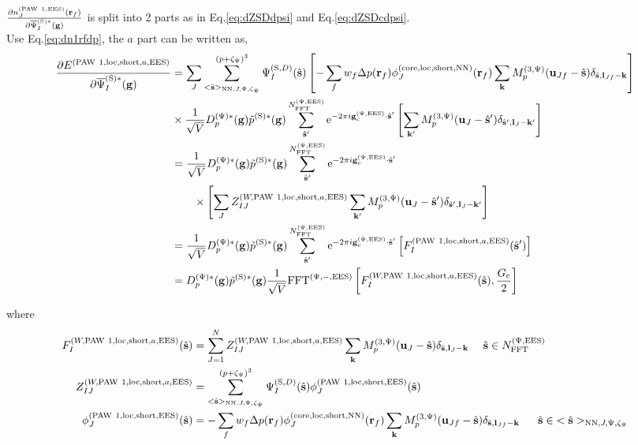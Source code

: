 \documentclass[paper=a4, fontsize=11pt]{article} %
\numberwithin{equation}{section} %
\numberwithin{figure}{section} %
\numberwithin{table}{section} %
\newcommand{\p}{\partial}
\newcommand{\bu}{{\bf{u}}}
\newcommand{\bl}{{\bf{l}}}
\newcommand{\bk}{{\bf{k}}}
\newcommand{\bs}{{\bf{s}}}
\newcommand{\bg}{{\bf{g}}}
\newcommand{\br}{{\bf{r}}}
\newcommand{\hs}{{\hat{\bf{s}}}}
\newcommand{\rS}{{\mathrm{S}}}
\newcommand{\rEES}{{\mathrm{EES}}}
\newcommand{\rcore}{{\mathrm{core}}}
\newcommand{\rNN}{{\mathrm{NN}}}
\newcommand{\re}{{\mathrm{e}}}
\newcommand{\rshort}{{\mathrm{short}}}
\newcommand{\rP}{{\mathrm{PAW}}}
\newcommand{\rlo}{{\mathrm{loc}}}
\newcommand{\gcpEES}{{\bg_c^{(\Psi,\rEES)}}}
\newcommand{\psigsc}{{\overline \Psi_I^{(\rS)*}(\bg)}}
\newcommand{\NFFTpEES}{{N^{\mathrm{(\Psi,\rEES})}_{\mathrm{FFT}}}}
\newcommand{\hGc}{{\frac{G_{\mathrm{c}}}{2}}}
\newcommand{\Dpgc}{{D^{(\Psi)*}_p(\bg)}}
\newcommand{\Mp}{{M_p^{(3,\Psi)}}}
\newcommand{\FFTpiEES}{{\mathrm{FFT}^{(\Psi,-,\rEES)}}}
\newcommand{\pzp}{{(p+\zeta_{\Psi})^3}}
\newcommand{\hsJp}{{<\hs>_{\rNN,J,\Psi,\zeta_\Psi}}}
\newcommand{\hsinJp}{{\ \ \ \ \ \hs  \in  \hsJp}}
\newcommand{\hsinpEES}{{\ \ \ \ \hs \in \NFFTpEES}}
\begin{document}
$\frac{\p n_J^{(\rP\ 1,\rEES)}(\br_f)}{\p \psigsc}$ is split into 2 parts as in Eq.\eqref{eq:dZSDdpsi} and Eq.\eqref{eq:dZSDcdpsi}.\\

Use Eq.\eqref{eq:dn1rfdp}, the $a$ part can be written as,
\begin{equation}
\begin{split}
\frac{\p E^{(\rP\ 1,\rlo,\rshort,a,\rEES)}}{\p \psigsc}
&= \sum_J \sum_{\hsJp}^\pzp \Psi_{I}^{(\rS,D)}(\hat \bs) \left[-\sum_f w_f \Delta p(\br_f) \phi_J^{(\rcore,\rlo,\rshort,\rNN)}(\br_f) \sum_{\bk} \Mp(\bu_{Jf}-\hat \bs)\delta_{\hat \bs,\bl_{Jf}-\bk}\right] \\
&\times \frac{1}{\sqrt{V}} \Dpgc \tilde p^{(\rS)*}(\bg)  \sum_{\hat \bs'}^\NFFTpEES \re^{-2\pi i\gcpEES \cdot \hat\bs'} \left[\sum_{\bk'} \Mp(\bu_{J}-\hat \bs') \delta_{\hat \bs',\bl_J-\bk'}\right] \\
&= \frac{1}{\sqrt{V}} \Dpgc \tilde p^{(\rS)*}(\bg)\sum_{\hat \bs'}^\NFFTpEES \re^{-2\pi i\gcpEES \cdot \hat\bs'} \\
&\ \ \ \ \ \ \times \left[\sum_J Z_{IJ}^{(W,\rP\ 1,\rlo,\rshort,a,\rEES)}\sum_{\bk'} \Mp(\bu_{J}-\hat \bs') \delta_{\hat \bs',\bl_J-\bk'}\right] \\
&= \frac{1}{\sqrt{V}} \Dpgc \tilde p^{(\rS)*}(\bg)\sum_{\hat \bs'}^\NFFTpEES \re^{-2\pi i\gcpEES \cdot \hat\bs'} \left[F_I^{(\rP\ 1,\rlo,\rshort,a,\rEES)}(\hs')\right] \\
&= \Dpgc \tilde p^{(\rS)*}(\bg)\frac{1}{\sqrt{V}} \FFTpiEES \left[F_I^{(W,\rP\ 1,\rlo,\rshort,a,\rEES)}(\hs),\hGc \right] \\
\end{split}
\end{equation}

where
\begin{equation}\label{eq:dElocshortdpterms}
\begin{split}
F_I^{(W,\rP\ 1,\rlo,\rshort,a,\rEES)}(\hs) &= \sum_{J=1}^N Z_{IJ}^{(W,\rP\ 1,\rlo,\rshort,a,\rEES)}\sum_{\bk} \Mp(\bu_{J}-\hat \bs) \delta_{\hat \bs,\bl_J-\bk} \hsinpEES \\
Z_{IJ}^{(W,\rP\ 1,\rlo,\rshort,a,\rEES)} &= \sum_{\hsJp}^{\pzp} \Psi_{I}^{(\rS,D)}(\hat \bs) \phi_J^{(\rP\ 1,\rlo,\rshort,\rEES)}(\hs)\\
\phi_J^{(\rP\ 1,\rlo,\rshort,\rEES)}(\hs) &= -\sum_f w_f \Delta p(\br_f) \phi_J^{(\rcore,\rlo,\rshort,\rNN)}(\br_f) \sum_{\bk} \Mp(\bu_{Jf}-\hat \bs)\delta_{\hs,\bl_{Jf}-\bk} \hsinJp \\
\end{split}
\end{equation}
\end{document}
